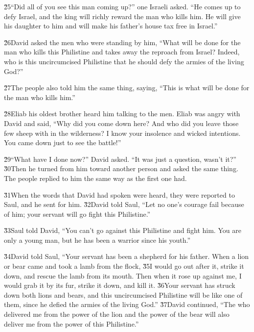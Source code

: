 \v{25}``Did all of you see this man coming up?'' one Israeli asked. ``He comes up to defy Israel, and the king will richly reward the man who kills him. He will give his daughter to him and will make his father's house tax free in Israel.''

\v{26}David asked the men who were standing by him, ``What will be done for the man who kills this Philistine and takes away the reproach from Israel? Indeed, who is this uncircumcised Philistine that he should defy the armies of the living God?''

\v{27}The people also told him the same thing, saying, ``This is what will be done for the man who kills him.''

\v{28}Eliab his oldest brother heard him talking to the men. Eliab was angry with David and said, ``Why did you come down here? And who did you leave those few sheep with in the wilderness? I know your insolence and wicked intentions. You came down just to see the battle!''

\v{29}``What have I done now?'' David asked. ``It was just a question, wasn't it?'' \v{30}Then he turned from him toward another person and asked the same thing. The people replied to him the same way as the first one had.

\v{31}When the words that David had spoken were heard, they were reported to Saul, and he sent for him. \v{32}David told Saul, ``Let no one's courage fail because of him; your servant will go fight this Philistine.''

\v{33}Saul told David, ``You can't go against this Philistine and fight him. You are only a young man, but he has been a warrior since his youth.''

\v{34}David told Saul, ``Your servant has been a shepherd for his father. When a lion or bear came and took a lamb from the flock, \v{35}I would go out after it, strike it down, and rescue the lamb from its mouth. Then when it rose up against me, I would grab it by its fur, strike it down, and kill it. \v{36}Your servant has struck down both lions and bears, and this uncircumcised Philistine will be like one of them, since he defied the armies of the living God.'' \v{37}David continued, ``The  who delivered me from the power of the lion and the power of the bear will also deliver me from the power of this Philistine.''

